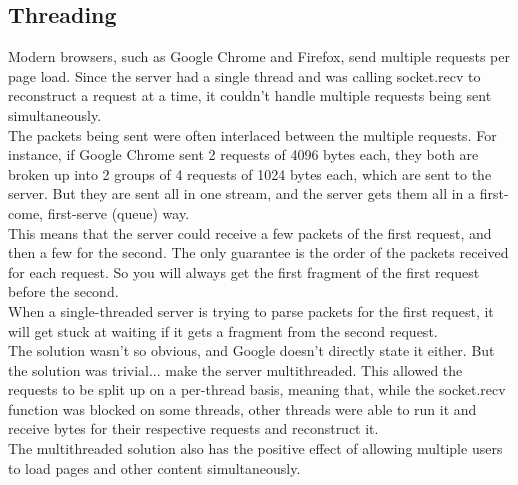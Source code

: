     \subsection{Threading}
        Modern browsers, such as Google Chrome and Firefox, send multiple requests per page load. Since the server had a single thread and was calling socket.recv to reconstruct a request at a time, it couldn't handle multiple requests being sent simultaneously.\\
The packets being sent were often interlaced between the multiple requests. For instance, if Google Chrome sent 2 requests of 4096 bytes each, they both are broken up into 2 groups of 4 requests of 1024 bytes each, which are sent to the server. But they are sent all in one stream, and the server gets them all in a first-come, first-serve (queue) way.\\
This means that the server could receive a few packets of the first request, and then a few for the second. The only guarantee is the order of the packets received for each request. So you will always get the first fragment of the first request before the second.\\
When a single-threaded server is trying to parse packets for the first request, it will get stuck at waiting if it gets a fragment from the second request. \\
The solution wasn't so obvious, and Google doesn't directly state it either. But the solution was trivial... make the server multithreaded. This allowed the requests to be split up on a per-thread basis, meaning that, while the socket.recv function was blocked on some threads, other threads were able to run it and receive bytes for their respective requests and reconstruct it. \\
The multithreaded solution also has the positive effect of allowing multiple users to load pages and other content simultaneously.
